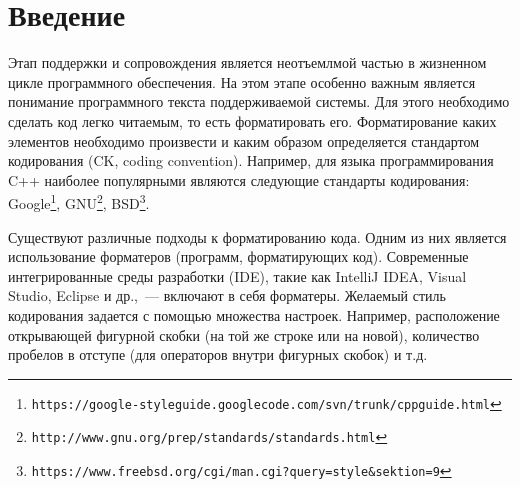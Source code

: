 \documentclass[conference]{IEEEtran}
\begin{document}
\section{Введение}







Этап поддержки и сопровождения является неотъемлмой частью в жизненном цикле программного обеспечения. %
На этом этапе особенно важным является понимание программного текста поддерживаемой системы. 
Для этого необходимо сделать код легко читаемым, то есть форматировать его.
Форматирование каких элементов необходимо произвести и каким образом определяется стандартом кодирования (CK, coding convention).
Например, для языка программирования C++ наиболее популярными являются следующие стандарты кодирования: Google\footnote{\texttt{https://google-styleguide.googlecode.com/svn/trunk/cppguide.html}}, GNU\footnote{\texttt{http://www.gnu.org/prep/standards/standards.html}}, BSD\footnote{\texttt{https://www.freebsd.org/cgi/man.cgi?query=style\&sektion=9}}.

Существуют различные подходы к форматированию кода. Одним из них является использование форматеров (программ, форматирующих код).
Современные интегрированные среды разработки (IDE), такие как IntelliJ IDEA, Visual Studio, Eclipse и др.,~--- включают в себя форматеры.
Желаемый стиль кодирования задается с помощью множества настроек. Например, расположение открывающей фигурной скобки (на той же строке или на новой), количество пробелов в отступе (для операторов внутри фигурных скобок) и т.д.
\end{document}
